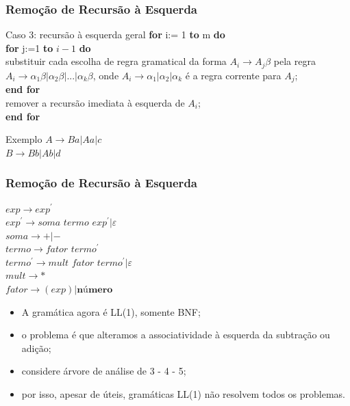 \documentclass[table]{beamer}
\begin{document}
\begin{frame}[fragile]
   \frametitle{Remoção de Recursão à Esquerda}
   \begin{block}{Caso 3: recursão à esquerda geral}
\textbf{for} i:= 1 \textbf{to} m \textbf{do} \\
\hspace{0.4cm} \textbf{for} j:=1 \textbf{to} $i - 1$ \textbf{do} \\
\hspace{1.0cm} substituir cada escolha de regra gramatical da forma $A_{i} \to A_{j}\beta$ pela regra $A_{i} \to \alpha_{1}\beta | \alpha_{2}\beta | \text{...} | \alpha_{k}\beta$, onde $A_{i} \to \alpha_{1} | \alpha_{2} | \alpha_{k}$ é a regra corrente para $A_{j}$; \\
\hspace{0.4cm} \textbf{end for} \\
\hspace{0.4cm} remover a recursão imediata à esquerda de $A_{i}$; \\
\textbf{end for}
   \end{block}
   \begin{block}{Exemplo}
   $A \to Ba | Aa | c$\\
   $B \to Bb | Ab | d $
   \end{block}
\end{frame}

\begin{frame}
   \frametitle{Remoção de Recursão à Esquerda}
   $ exp \to exp^{'}$ \\
   $ exp^{'} \to \textit{soma termo } exp^{'} | \varepsilon $ \\
   $ soma \to +|-$ \\
   $ termo \to \textit{fator } termo^{'}$ \\
   $ termo^{'} \to \textit{mult fator } termo^{'} | \varepsilon $ \\
   $ mult \to * $ \\
   $ fator \to (exp) | \textbf{número} $
   \begin{itemize}
      \item A gramática agora é LL(1), somente BNF;
      \item o problema é que alteramos a associatividade à esquerda da subtração ou adição;
      \item considere árvore de análise de 3 - 4 - 5;
      \item por isso, apesar de úteis, gramáticas LL(1) não resolvem todos os problemas.
   \end{itemize}
\end{frame}
\end{document}
